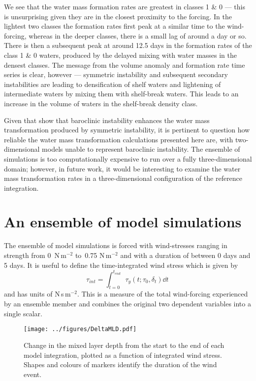 We see that the water mass formation rates are greatest in classes 1 \& 0 --- this is unsurprising given they are in the closest proximity to the forcing. In the lightest two classes the formation rates first peak at a similar time to the wind-forcing, whereas in the deeper classes, there is a small lag of around a day or so. There is then a subsequent peak at around 12.5 days in the formation rates of the class 1 \& 0 waters, produced by the delayed mixing with water masses in the densest classes. The message from the volume anomaly and formation rate time series is clear, however --- symmetric instability and subsequent secondary instabilities are leading to densification of shelf waters and lightening of intermediate waters by mixing them with shelf-break waters. This leads to an increase in the volume of waters in the shelf-break density class.

Given that \citet{Spall2016} show that baroclinic instability enhances the water mass transformation produced by symmetric instability, it is pertinent to question how reliable the water mass transformation calculations presented here are, with two-dimensional models unable to represent baroclinic instability. The ensemble of simulations is too computationally expensive to run over a fully three-dimensional domain; however, in future work, it would be interesting to examine the water mass transformation rates in a three-dimensional configuration of the reference integration.

\section{An ensemble of model simulations}
\label{sec:IrmEns}
The ensemble of model simulations is forced with wind-stresses ranging in strength from 0~N\,m$^{-2}$ to~0.75 N\,m$^{-2}$ and with a duration of between 0 days and 5 days. It is useful to define the time-integrated wind stress which is given by
\begin{equation}
    \tau_{int} = \int^{t_{end}}_{t=0} \tau_y(t; \tau_0, \delta_t)\dd t \,
\end{equation}
and has units of N\,s\,m$^{-2}$. This is a measure of the total wind-forcing experienced by an ensemble member and combines the original two dependent variables into a single scalar.

\begin{figure}[t]
    \centering
    \texttt{[image: ../figures/DeltaMLD.pdf]}
    \caption{Change in the mixed layer depth from the start to the end of each model integration, plotted as a function of integrated wind stress. Shapes and colours of markers identify the duration of the wind event.}
    \label{fig:DeltaMLD}
\end{figure}

